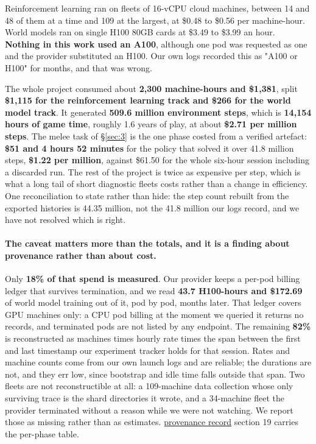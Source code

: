 \documentclass[11pt]{article}
\begin{document}
Reinforcement learning ran on fleets of 16-vCPU cloud machines, between 14 and 48 of them at a time and 109 at the largest, at \$0.48 to \$0.56 per machine-hour. World models ran on single H100 80GB cards at \$3.49 to \$3.99 an hour. \textbf{Nothing in this work used an A100}, although one pod was requested as one and the provider substituted an H100. Our own logs recorded this as "A100 or H100" for months, and that was wrong.

The whole project consumed about \textbf{2,300 machine-hours and \$1,381}, split \textbf{\$1,115 for the reinforcement learning track and \$266 for the world model track}. It generated \textbf{509.6 million environment steps}, which is \textbf{14,154 hours of game time}, roughly 1.6 years of play, at about \textbf{\$2.71 per million steps}. The melee task of \S\ref{sec:3} is the one phase costed from a verified artefact: \textbf{\$51 and 4 hours 52 minutes} for the policy that solved it over 41.8 million steps, \textbf{\$1.22 per million}, against \$61.50 for the whole six-hour session including a discarded run. The rest of the project is twice as expensive per step, which is what a long tail of short diagnostic fleets costs rather than a change in efficiency. One reconciliation to state rather than hide: the step count rebuilt from the exported histories is 44.35 million, not the 41.8 million our logs record, and we have not resolved which is right.

\paragraph{The caveat matters more than the totals, and it is a finding about provenance rather than about cost.} Only \textbf{18\% of that spend is measured}. Our provider keeps a per-pod billing ledger that survives termination, and we read \textbf{43.7 H100-hours and \$172.69} of world model training out of it, pod by pod, months later. That ledger covers GPU machines only: a CPU pod billing at the moment we queried it returns no records, and terminated pods are not listed by any endpoint. The remaining \textbf{82\%} is reconstructed as machines times hourly rate times the span between the first and last timestamp our experiment tracker holds for that session. Rates and machine counts come from our own launch logs and are reliable; the durations are not, and they err low, since bootstrap and idle time falls outside that span. Two fleets are not reconstructible at all: a 109-machine data collection whose only surviving trace is the shard directories it wrote, and a 34-machine fleet the provider terminated without a reason while we were not watching. We report those as missing rather than as estimates. \href{https://github.com/JordyKieto/ppo-hyrule/blob/main/PROVENANCE.md}{provenance record} section 19 carries the per-phase table.
\end{document}
